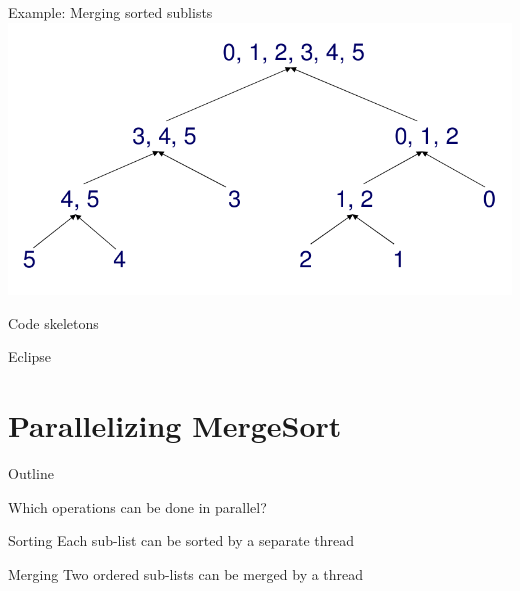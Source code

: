 \begin{frame}{Example: Merging sorted sublists}
  \includegraphics[width=\textwidth]{figures/mergesort-merge}  
\end{frame}

\begin{frame}{Code skeletons}
  \begin{center}
    {\huge Eclipse}
  \end{center}
\end{frame}


\section{Parallelizing MergeSort}

\begin{frame}{Outline}
  \tableofcontents[current]
\end{frame}

\begin{frame}{Which operations can be done in parallel?}
  
  \pause

  \begin{block}{Sorting}
    Each sub-list can be sorted by a separate thread
  \end{block}


  \pause

  \begin{block}{Merging}
    Two ordered sub-lists can be merged by a thread
  \end{block}
\end{frame}

